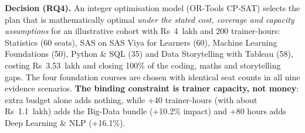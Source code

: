 \textbf{Decision (RQ4).} An integer optimisation model (OR-Tools CP-SAT) selects the plan that is
mathematically optimal \emph{under the stated cost, coverage and capacity assumptions} for an
illustrative cohort with Rs~4~lakh and 200 trainer-hours: Statistics (60 seats), SAS on
SAS Viya for Learners (60), Machine Learning Foundations (50), Python \& SQL (35) and Data
Storytelling with Tableau (58), costing Rs~3.53~lakh and closing 100\% of the coding, maths and
storytelling gaps. The four foundation courses are chosen with identical seat counts in all nine
evidence scenarios. \textbf{The binding constraint is trainer capacity, not money}: extra budget
alone adds nothing, while +40 trainer-hours (with about Rs~1.1~lakh) adds the Big-Data bundle
(+10.2\% impact) and +80 hours adds Deep Learning \& NLP (+16.1\%).

\clearpage
